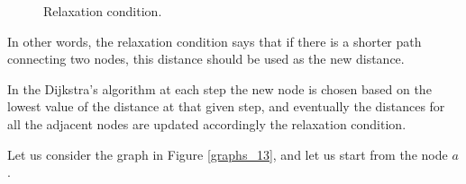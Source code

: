 \begin{figure}[H]

\centering
{}

\caption[Relaxation condition.]{Relaxation condition.}
\label{graphs_12}
\end{figure}

In other words, the relaxation condition says that if there is a shorter path connecting two nodes, this distance should be used as the new distance.

In the Dijkstra's algorithm at each step the new node is chosen based on the lowest value of the distance at that given step, and eventually the distances for all the adjacent nodes are updated accordingly the relaxation condition.

Let us consider the graph in Figure \ref{graphs_13}, and let us start from the node \(a\) \cite{dijkstraexplaination}.

